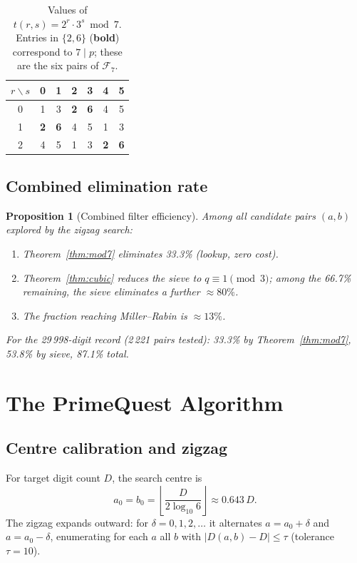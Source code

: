 \documentclass[11pt,a4paper]{article}
\theoremstyle{plain}
\newtheorem{proposition}[theorem]{Proposition}
\theoremstyle{definition}
\begin{document}
\begin{table}[ht]
\centering
\caption{Values of $t(r, s) = 2^r \cdot 3^s \bmod 7$. Entries in $\{2, 6\}$
(\textbf{bold}) correspond to $7 \mid p$; these are the six pairs of
$\mathcal{F}_7$.}
\label{tab:t-rs}
\begin{tabular}{c|cccccc}
\toprule
$r \backslash s$ & 0 & 1 & 2 & 3 & 4 & 5 \\
\midrule
0 & 1 & 3 & \textbf{2} & \textbf{6} & 4 & 5 \\
1 & \textbf{2} & \textbf{6} & 4 & 5 & 1 & 3 \\
2 & 4 & 5 & 1 & 3 & \textbf{2} & \textbf{6} \\
\bottomrule
\end{tabular}
\end{table}

\subsection{Combined elimination rate}

\begin{proposition}[Combined filter efficiency]\label{prop:combined}
Among all candidate pairs $(a, b)$ explored by the zigzag search:
\begin{enumerate}[leftmargin=*,label=(\roman*)]
\item Theorem~\ref{thm:mod7} eliminates 33.3\% (lookup, zero cost).
\item Theorem~\ref{thm:cubic} reduces the sieve to $q \equiv 1 \pmod{3}$;
among the 66.7\% remaining, the sieve eliminates a further $\approx 80\%$.
\item The fraction reaching Miller--Rabin is $\approx 13\%$.
\end{enumerate}
For the 29\,998-digit record (2\,221 pairs tested): 33.3\% by
Theorem~\ref{thm:mod7}, 53.8\% by sieve, 87.1\% total.
\end{proposition}

\section{The PrimeQuest Algorithm}
\label{sec:algorithm}

\subsection{Centre calibration and zigzag}

For target digit count $D$, the search centre is
\[
a_0 = b_0 = \left\lfloor \frac{D}{2 \log_{10} 6} \right\rfloor \approx 0.643 \, D.
\]
The zigzag expands outward: for $\delta = 0, 1, 2, \ldots$ it alternates
$a = a_0 + \delta$ and $a = a_0 - \delta$, enumerating for each $a$ all $b$
with $|D(a, b) - D| \le \tau$ (tolerance $\tau = 10$).
\end{document}
